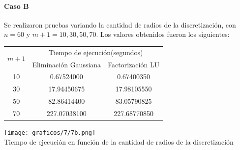     \paragraph{Caso B}
      Se realizaron pruebas variando la cantidad de radios de la discretización, con $n = 60$ y $m+1 = 10, 30, 50, 70$. Los valores obtenidos fueron los siguientes:

      \begin{center}
        \begin{tabular}{c|c|c}
          \multirow{2}{*}{$m + 1$} & \multicolumn{2}{c}{Tiempo de ejecución(segundos)} \\ 
          & Eliminación Gaussiana & Factorización LU \\ \hline
          10 & 0.67524000 & 0.67400350 \\
          30 & 17.94450675 & 17.98105550 \\
          50 & 82.86414400 & 83.05790825 \\
          70 & 227.07038100 & 227.68770850 \\
        \end{tabular}
      \end{center}

      \begin{center}
        \texttt{[image: graficos/7/7b.png]} \\
        {\small Tiempo de ejecución en función de la cantidad de radios de la discretización}
      \end{center}
